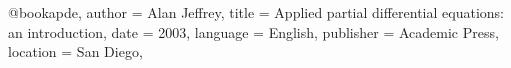 @book{apde,
	author = {Alan Jeffrey},
	title = {Applied partial differential equations: an introduction},
	date = {2003},
	language = {English},
	publisher = {Academic Press},
	location = {San Diego},
}
